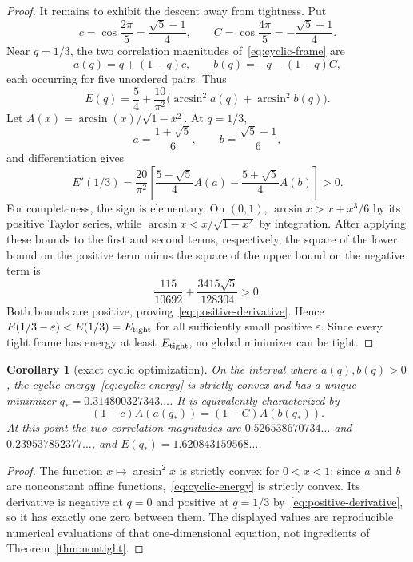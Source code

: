 \documentclass[11pt]{article}
\newtheorem{corollary}[theorem]{Corollary}
\begin{document}
\begin{proof}
It remains to exhibit the descent away from tightness.  Put
\[
 c=\cos\frac{2\pi}{5}=\frac{\sqrt5-1}{4},\qquad
 C=\cos\frac{4\pi}{5}=-\frac{\sqrt5+1}{4}.
\]
Near $q=1/3$, the two correlation magnitudes of~\eqref{eq:cyclic-frame} are
\[
 a(q)=q+(1-q)c,
 \qquad b(q)=-q-(1-q)C,
\]
each occurring for five unordered pairs.  Thus
\begin{equation}\label{eq:cyclic-energy}
 E(q)=\frac54+\frac{10}{\pi^2}
 \bigl(\arcsin^2 a(q)+\arcsin^2 b(q)\bigr).
\end{equation}
Let $A(x)=\arcsin(x)/\sqrt{1-x^2}$.  At $q=1/3$,
\[
 a=\frac{1+\sqrt5}{6},\qquad b=\frac{\sqrt5-1}{6},
\]
and differentiation gives
\begin{equation}\label{eq:positive-derivative}
 E'(1/3)=\frac{20}{\pi^2}\left[
 \frac{5-\sqrt5}{4}A(a)-
 \frac{5+\sqrt5}{4}A(b)\right]>0.
\end{equation}
For completeness, the sign is elementary.  On $(0,1)$,
\(
 \arcsin x>x+x^3/6
\)
by its positive Taylor series, while
\(
 \arcsin x<x/\sqrt{1-x^2}
\)
by integration.  After applying these bounds to the first and second terms,
respectively, the square of the lower bound on the positive term minus the
square of the upper bound on the negative term is
\[
 \frac{115}{10692}+\frac{3415\sqrt5}{128304}>0.
\]
Both bounds are positive, proving~\eqref{eq:positive-derivative}.  Hence
$E(1/3-\varepsilon)<E(1/3)=E_{\rm tight}$ for all sufficiently small positive
$\varepsilon$.  Since every tight frame has energy at least $E_{\rm tight}$,
no global minimizer can be tight.
\end{proof}

\begin{corollary}[exact cyclic optimization]\label{cor:cyclic}
On the interval where $a(q),b(q)>0$, the cyclic energy~\eqref{eq:cyclic-energy}
is strictly convex and has a unique minimizer $q_*=0.314800327343\ldots$.  It
is equivalently characterized by
\[
 (1-c)A(a(q_*))=(1-C)A(b(q_*)).
\]
At this point the two correlation magnitudes are
$0.526538670734\ldots$ and $0.239537852377\ldots$, and
$E(q_*)=1.620843159568\ldots$.
\end{corollary}

\begin{proof}
The function $x\mapsto\arcsin^2x$ is strictly convex for $0<x<1$; since
$a$ and $b$ are nonconstant affine functions,~\eqref{eq:cyclic-energy} is
strictly convex.  Its derivative is negative at $q=0$ and positive at
$q=1/3$ by~\eqref{eq:positive-derivative}, so it has exactly one zero between
them.  The displayed values are reproducible numerical evaluations of that
one-dimensional equation, not ingredients of Theorem~\ref{thm:nontight}.
\end{proof}
\end{document}
